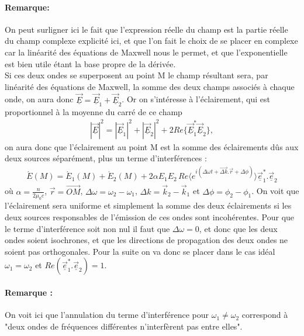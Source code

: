 \documentclass[12pt,prb,aps,epsf]{report}
\begin{document}
\paragraph{Remarque:} On peut surligner ici le fait que l'expression réelle du champ est la partie réelle du champ complexe explicité ici, et que l'on fait le choix de se placer en complexe car la linéarité des équations de Maxwell nous le permet, et que l'exponentielle est bien utile étant la base propre de la dérivée.\\
 Si ces deux ondes se superposent au point M le champ résultant sera, par linéarité des équations de Maxwell, la somme des deux champs associés à chaque onde, on aura donc $\underline{\vec{E}} = \underline{\vec{E}}_1 + \underline{\vec{E}}_2$. Or on s'intéresse à l'éclairement, qui est proportionnel à la moyenne du carré de ce champ
\begin{eqnarray}
|\underline{\vec{E}}|^2 = |\underline{\vec{E}}_1|^2 +|\underline{\vec{E}}_2|^2 +2Re\{\underline{\vec{E}}_1^*\underline{\vec{E}}_2\},
\end{eqnarray} 
on aura donc que l'éclairement au point M est la somme des éclairements dûs aux deux sources séparément, plus un terme d'interférences :
\begin{eqnarray}
\acute{E}(M) = \acute{E}_1(M) + \acute{E}_2(M) + 2\alpha E_1E_2\, Re \langle  e^{i(\Delta\omega t+\vec{\Delta k}.\vec{r}+\Delta\phi)} \rangle \vec{\underline{e}}_1^*.\vec{\underline{e}}_2
\end{eqnarray}
où $\alpha= \frac{n}{2\mu_0c}$, $\vec{r}=\vec{OM}$, $\Delta\omega=\omega_2-\omega_1$, $\Delta k = \vec{k}_2-\vec{k}_1$ et $\Delta\phi=\phi_2-\phi_1$. On voit que l'éclairement sera uniforme et simplement la somme des deux éclairements si les deux sources responsables de l'émission de ces ondes sont incohérentes. Pour que le terme d'interférence soit non nul il faut que $\Delta\omega=0$, et donc que les deux ondes soient isochrones, et que les directions de propagation des deux ondes ne soient pas orthogonales. Pour la suite on va donc se placer dans le cas idéal $\omega_1=\omega_2$ et $Re(\vec{\underline{e}}_1^*.\vec{\underline{e}}_2)=1$.

\paragraph{Remarque :} On voit ici que l'annulation du terme d'interférence pour $\omega_1 \neq \omega_2$ correspond à "deux ondes de fréquences différentes n'interfèrent pas entre elles".
\end{document}
